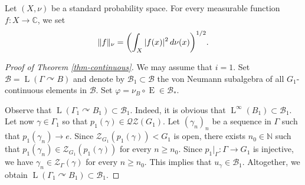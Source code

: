 \documentclass[11pt]{article}
\theoremstyle{definition}
\newcommand{\C}{\mathbb{C}}
\newcommand{\N}{\mathbb{N}}
\DeclareMathOperator{\rE}{ E}
\DeclareMathOperator{\rL}{L}
\begin{document}
Let $(X, \nu)$ be a standard probability space. For every measurable function \hbox{$f : X \to \C$}, we set
\[
\|f\|_{\nu} = \biggl( \int_X |f(x)|^2 \, {\rm d}\nu(x)\biggr)^{1/2}.
\]

\begin{proof}[Proof of Theorem \ref{thm-continuous}]
We may assume that $i = 1$. Set $\mathscr B = \rL(\Gamma \curvearrowright B)$ and denote by $\mathscr B_1 \subset \mathscr B$ the von Neumann subalgebra of all $G_1$-continuous elements in $\mathscr B$. Set $\varphi = \nu_B \circ \rE \in \mathscr B_\ast$.

Observe that $\rL(\Gamma_1 \curvearrowright B_1) \subset \mathscr B_1$. Indeed, it is obvious that $\rL^\infty(B_1) \subset \mathscr B_1$. Let now $\gamma \in \Gamma_1$ so that $p_1(\gamma) \in \mathscr{Q}\mathscr{Z}(G_1)$. Let $(\gamma_n)_n$ be a sequence in $\Gamma$ such that $p_1(\gamma_n) \to e$. Since $\mathscr Z_{G_1}(p_1(\gamma)) < G_1$ is open, there exists $n_0 \in \N$ such that $p_1(\gamma_n) \in \mathscr Z_{G_1}(p_1(\gamma))$ for every $n \geq n_0$. Since $p_1|_\Gamma : \Gamma \to G_1$ is injective, we have $\gamma_n \in \mathscr Z_\Gamma(\gamma)$ for every $n \geq n_0$. This implies that $u_\gamma \in \mathscr B_1$. Altogether, we obtain $\rL(\Gamma_1 \curvearrowright B_1) \subset \mathscr B_1$.


\end{proof}
\end{document}
